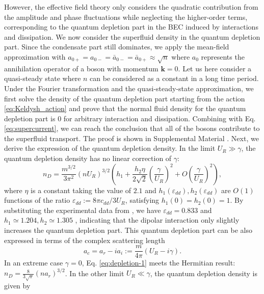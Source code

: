 \documentclass[aps,prl,twocolumn,superscriptaddress,]{revtex4-1}
\begin{document}
However, the effective field theory only considers the quadratic contribution from the amplitude and phase fluctuations while neglecting the higher-order terms, corresponding to the quantum depletion part in the BEC induced by interactions and dissipation. We now consider the superfluid density in the quantum depletion part. Since the condensate part still dominates, we apply the mean-field approximation with $a_{0+}=a_{0-}=\bar{a}_{0-}=\bar{a}_{0+}\approx\sqrt{n}$ where $a_{0}$ represents the annihilation operator of a boson with momentum $\bm{k}=0$. Let us here consider a quasi-steady state where $n$
can be considered as a constant in a long time period. Under the Fourier transformation and the quasi-steady-state approximation, we first solve the density of the quantum depletion part starting from the action \eqref{eq:Keldysh_action} and prove that the normal fluid density for the quantum depletion part is 0 for arbitrary interaction and dissipation. Combining with Eq. \eqref{eq:supercurrent}, we can reach the conclusion that all of the bosons contribute to the superfluid transport. The proof is shown in Supplemental Material \citep{SupplementaryMaterial}. Next, we derive the expression of the quantum depletion density. In the limit $U_{R}\gg\gamma$, the quantum depletion density has no
linear correction of $\gamma$: 
\begin{equation}\label{eq:depletion-1}
n_{D}=\frac{m^{3/2}}{3\pi^{2}}(nU_R)^{3/2}\left(h_1+\frac{h_2\eta}{2\sqrt{2}}\left(\frac{\gamma}{U_{R}}\right)^{2}+O\left(\frac{\gamma}{U_{R}}\right)^{2}\right),
\end{equation}
where $\eta$ is a constant taking the value of $2.1$ and $h_1(\varepsilon_{dd}),h_2(\varepsilon_{dd})$ are $O(1)$ functions of the ratio $\varepsilon_{dd}:=8\pi c_{dd}/3U_R$, satisfying $h_1(0)=h_2(0)=1$. By substituting the experimental data from \cite{Bigagli2023}, we have $\varepsilon_{dd}=0.833$ and $h_1\simeq1.204,h_2\simeq1.305$ \cite{Lima2011,Lima2012}, indicating that the dipolar interaction only slightly increases the quantum depletion part. This quantum depletion part can be also expressed in terms of the complex scattering length \citep{PhysRevA.79.023614,PhysRevA.103.013724}
\begin{equation}
a_{c}=a_{r}-ia_{i}:=\frac{m}{4\pi}(U_{R}-i\gamma).\label{eq:definition_ac}
\end{equation}
In an extreme case $\gamma=0$, Eq. \eqref{eq:depletion-1} meets the Hermitian result:
$n_{D}=\frac{8}{3\sqrt{\pi}}(na_{r})^{3/2}$. In the other limit $U_{R}\ll\gamma$,
the quantum depletion density is given by 
\end{document}
